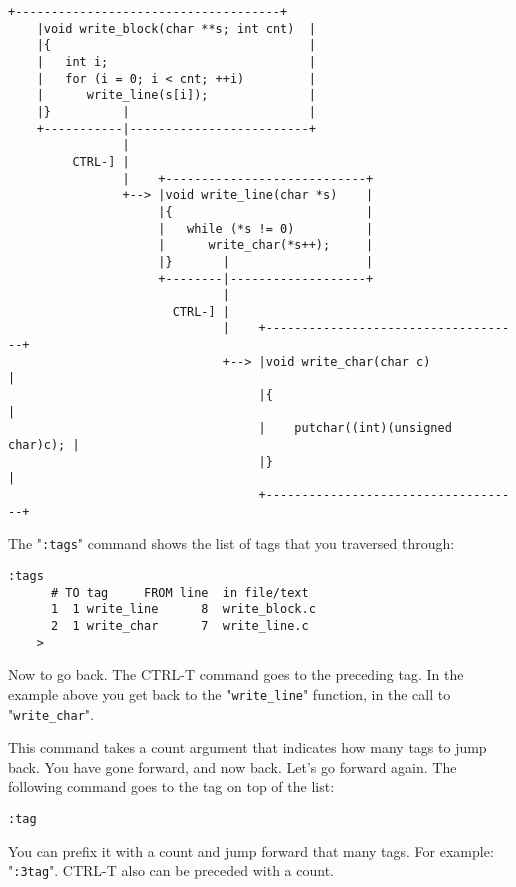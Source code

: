 \begin{Verbatim}[samepage=true]
    +-------------------------------------+
    |void write_block(char **s; int cnt)  |
    |{                                    |
    |   int i;                            |
    |   for (i = 0; i < cnt; ++i)         |
    |      write_line(s[i]);              |
    |}          |                         |
    +-----------|-------------------------+
                |
         CTRL-] |
                |    +----------------------------+
                +--> |void write_line(char *s)    |
                     |{                           |
                     |   while (*s != 0)          |
                     |      write_char(*s++);     |
                     |}       |                   |
                     +--------|-------------------+
                              |
                       CTRL-] |
                              |    +------------------------------------+
                              +--> |void write_char(char c)             |
                                   |{                                   |
                                   |    putchar((int)(unsigned char)c); |
                                   |}                                   |
                                   +------------------------------------+
\end{Verbatim}

The "\texttt{:tags}" command shows the list of tags that you traversed through:

\begin{Verbatim}[samepage=true]
    :tags
      # TO tag     FROM line  in file/text 
      1  1 write_line      8  write_block.c 
      2  1 write_char      7  write_line.c 
    > 
\end{Verbatim}

Now to go back.
The CTRL-T command goes to the preceding tag.
In the example above you get back to the "\texttt{write\_line}" function, in the call to "\texttt{write\_char}".

This command takes a count argument that indicates how many tags to jump back.
You have gone forward, and now back.
Let's go forward again.
The following command goes to the tag on top of the list:

\begin{Verbatim}[samepage=true]
 :tag
\end{Verbatim}

You can prefix it with a count and jump forward that many tags.
For example: "\texttt{:3tag}".
CTRL-T also can be preceded with a count.

